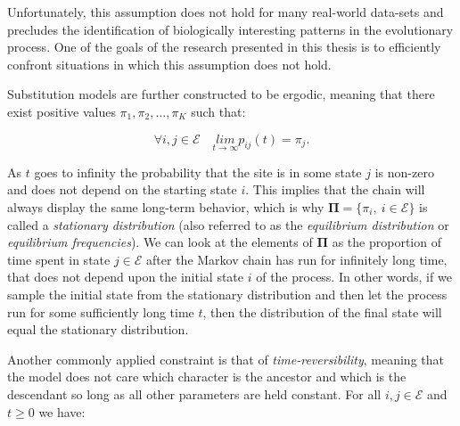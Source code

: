 Unfortunately, this assumption does not hold for many real-world data-sets and precludes the identification of biologically interesting patterns in the evolutionary process. %
One of the goals of the research presented in this thesis is to efficiently confront situations in which this assumption does not hold.

Substitution models are further constructed to be ergodic, meaning that there exist positive values $\pi_{1},\pi_{2},\ldots,\pi_{K}$ such that:

\begin{equation}
\forall i,j\in \mathcal{E}  \quad\underset{t\rightarrow\infty}{lim}p_{ij}(t)=\pi_{j}.
\label{eq:ergodicity}
\end{equation}


As $t$ goes to infinity the probability that the site is in some state $j$ is non-zero and does not depend on the starting state $i$.
This implies that the chain will always display the same long-term behavior, which is why $\mathbf{\Pi}=\{\pi_{i},\ i\in\mathcal{E}\}$ is called a \emph{stationary distribution} (also referred to as the \emph{equilibrium distribution} or \emph{equilibrium frequencies}).
We can look at the elements of $\mathbf{\Pi}$ as the proportion of time spent in state $j\in\mathcal{E}$ after the Markov chain has run for infinitely long time, that does not depend upon the initial state $i$ of the process.
In other words, if we sample the initial state from the stationary distribution and then let the process run for some sufficiently long time $t$, then the distribution of the final state will equal the stationary distribution. 

Another commonly applied constraint is that of \emph{time-reversibility}, meaning that the model does not care which character is the ancestor and which is the descendant so long as all other parameters are held constant.
For all $i,j\in \mathcal{E}$ and $t\geq 0$ we have:

